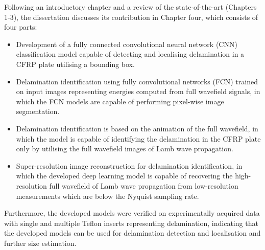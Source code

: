 {	Following an introductory chapter and a review of the state-of-the-art (Chapters 1-3), the dissertation discusses its contribution in Chapter four, which consists of four parts:
	\begin{itemize}
		\item Development of a fully connected convolutional neural network (CNN) classification model capable of detecting and localising delamination in a CFRP plate utilising a bounding box.
		\item Delamination identification using fully convolutional networks (FCN) trained on input images representing energies computed from full wavefield signals, in which the FCN models are capable of performing pixel-wise image segmentation.
		\item Delamination identification is based on the animation of the full wavefield, in which the model is capable of identifying the delamination in the CFRP plate only by utilising the full wavefield images of Lamb wave propagation.
		\item Super-resolution image reconstruction for delamination identification, in which the developed deep learning model is capable of recovering the high-resolution full wavefield of Lamb wave propagation from low-resolution measurements which are below the Nyquist sampling rate.
	\end{itemize}
	Furthermore, the developed models were verified on experimentally acquired data with single and multiple Teflon inserts representing delamination, indicating that the developed models can be used for
	delamination detection and localisation and further size estimation.
}

